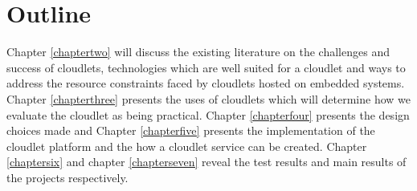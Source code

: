 \section{Outline}
Chapter \ref{chaptertwo} will discuss the existing literature on the challenges and success of cloudlets, technologies which are well suited for a cloudlet and ways to address the resource constraints faced by cloudlets hosted on embedded systems. Chapter \ref{chapterthree} presents the uses of cloudlets which will determine how we evaluate the cloudlet as being practical. Chapter \ref{chapterfour} presents the design choices made and Chapter \ref{chapterfive} presents the implementation of the cloudlet platform and the how a cloudlet service can be created. Chapter \ref{chaptersix} and chapter \ref{chapterseven} reveal the test results and main results of the projects respectively.